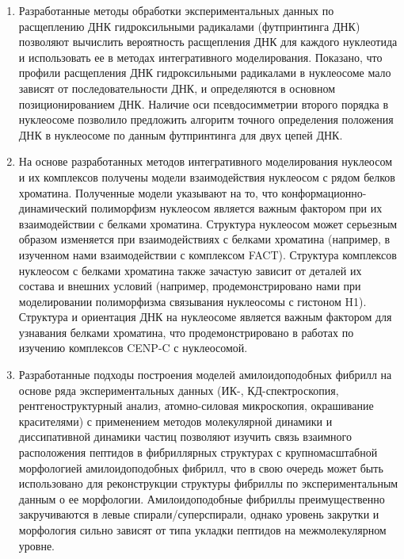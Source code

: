 \begin{enumerate}
  

  \item Разработанные методы обработки экспериментальных данных по расщеплению ДНК гидроксильными радикалами (футпринтинга ДНК) позволяют вычислить вероятность расщепления ДНК для каждого нуклеотида и использовать ее в методах интегративного моделирования. Показано, что профили расщепления ДНК гидроксильными радикалами в нуклеосоме мало зависят от последовательности ДНК, и определяются в основном позиционированием ДНК. Наличие оси псевдосимметрии второго порядка в нуклеосоме позволило предложить алгоритм точного определения положения ДНК в нуклеосоме по данным футпринтинга для двух цепей ДНК.

  \item  На основе разработанных методов интегративного моделирования нуклеосом и их комплексов получены модели взаимодействия нуклеосом с рядом белков хроматина. Полученные модели указывают на то, что конформационно-динамический полиморфизм нуклеосом является важным фактором при их взаимодействии с белками хроматина. Структура нуклеосом может серьезным образом изменяется при взаимодействиях с белками хроматина (например, в изученном нами взаимодействии с комплексом FACT). Структура комплексов нуклеосом с белками хроматина также зачастую зависит от деталей их состава и внешних условий (например, продемонстрировано нами при моделировании полиморфизма связывания нуклеосомы с гистоном H1). Структура и ориентация ДНК на нуклеосоме является важным фактором для узнавания белками хроматина, что продемонстрировано в работах по изучению комплексов CENP-C с нуклеосомой.

 \item Разработанные подходы построения моделей амилоидоподобных фибрилл на основе ряда экспериментальных данных (ИК-, КД-спектроскопия, рентгеноструктурный анализ, атомно-силовая микроскопия, окрашивание красителями) с применением методов молекулярной динамики и диссипативной динамики частиц позволяют изучить связь взаимного расположения пептидов в фибриллярных структурах с крупномасштабной морфологией амилоидоподобных фибрилл, что в свою очередь может быть использовано для реконструкции структуры фибриллы по экспериментальным данным о ее морфологии. Амилоидоподобные фибриллы преимущественно закручиваются в левые спирали/суперспирали, однако уровень закрутки и морфология сильно зависят от типа укладки пептидов на межмолекулярном уровне.

\end{enumerate}



